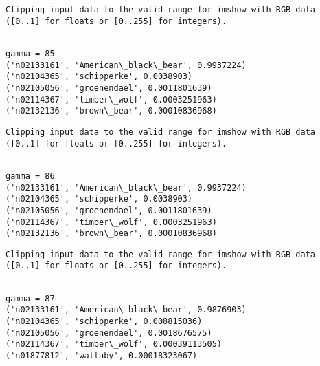 \documentclass[11pt]{article}
\begin{document}
    \begin{Verbatim}[commandchars=\\\{\}]
Clipping input data to the valid range for imshow with RGB data ([0..1] for floats or [0..255] for integers).

    \end{Verbatim}

    \begin{Verbatim}[commandchars=\\\{\}]

gamma = 85
('n02133161', 'American\_black\_bear', 0.9937224)
('n02104365', 'schipperke', 0.0038903)
('n02105056', 'groenendael', 0.0011801639)
('n02114367', 'timber\_wolf', 0.0003251963)
('n02132136', 'brown\_bear', 0.00010836968)

    \end{Verbatim}

    \begin{Verbatim}[commandchars=\\\{\}]
Clipping input data to the valid range for imshow with RGB data ([0..1] for floats or [0..255] for integers).

    \end{Verbatim}

    \begin{Verbatim}[commandchars=\\\{\}]

gamma = 86
('n02133161', 'American\_black\_bear', 0.9937224)
('n02104365', 'schipperke', 0.0038903)
('n02105056', 'groenendael', 0.0011801639)
('n02114367', 'timber\_wolf', 0.0003251963)
('n02132136', 'brown\_bear', 0.00010836968)

    \end{Verbatim}

    \begin{Verbatim}[commandchars=\\\{\}]
Clipping input data to the valid range for imshow with RGB data ([0..1] for floats or [0..255] for integers).

    \end{Verbatim}

    \begin{Verbatim}[commandchars=\\\{\}]

gamma = 87
('n02133161', 'American\_black\_bear', 0.9876903)
('n02104365', 'schipperke', 0.008815036)
('n02105056', 'groenendael', 0.0018676575)
('n02114367', 'timber\_wolf', 0.00039113505)
('n01877812', 'wallaby', 0.00018323067)

    \end{Verbatim}
\end{document}
